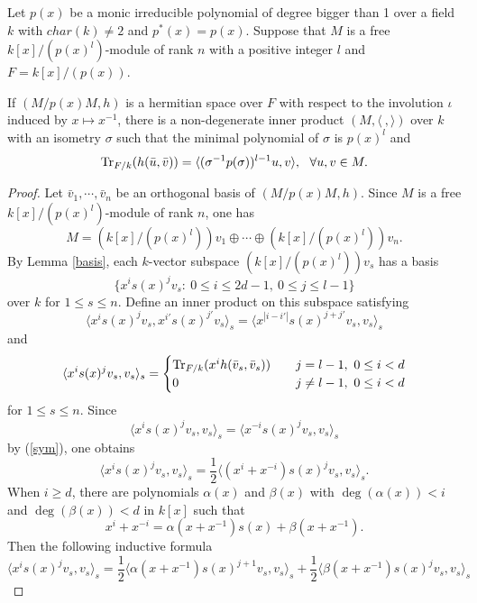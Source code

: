 \documentclass[12pt]{amsart}
\begin{document}
\begin{prop} \label{realization} Let $p(x)$ be a monic irreducible polynomial of degree bigger than 1 over a field $k$ with $char(k)\neq 2$ and $p^*(x)=p(x)$.  Suppose that $M$ is a free $k[x]/(p(x)^l)$-module of rank $n$ with a positive integer $l$ and $F=k[x]/(p(x))$. 

If $(M/p(x)M, h)$ is a hermitian space over $F$ with respect to the involution $\iota$ induced by $x\mapsto x^{-1}$,   there is a non-degenerate inner product $(M, \langle \ , \rangle)$ over $k$ with an isometry $\sigma$ such that the minimal polynomial of $\sigma$ is $p(x)^l$ and 
$$ {\rm Tr}_{F/k}(h(\bar u, \bar v))= \langle (\sigma^{-1} p(\sigma))^{l-1} u, v \rangle , \ \ \forall u, v \in M .$$
\end{prop}
\begin{proof} Let $\bar v_1, \cdots, \bar v_n$ be an orthogonal basis of $(M/p(x)M, h)$. Since $M$ is a free $k[x]/(p(x)^l)$-module of rank $n$, one has 
$$ M = (k[x]/(p(x)^l) )v_1 \oplus \cdots \oplus (k[x]/(p(x)^l)) v_n .$$
By Lemma \ref{basis}, each $k$-vector subspace $(k[x]/(p(x)^l) )v_s$ has a basis $$\{ x^i s(x)^j v_s: \ 0\leq i \leq 2d-1, \ 0\leq j \leq l-1 \} $$ over $k$ for $1\leq s\leq n$. Define an inner product on this subspace satisfying 
\begin{equation} \label{sym}  \langle x^{i}s(x)^j v_s, x^{i'}s(x)^{j'} v_s \rangle_s = \langle x^{|i-i'|} s(x)^{j+j'} v_s, v_s \rangle_s \end{equation}
and 
 \begin{equation} \label{value} \langle x^i s(x)^j v_s, v_s \rangle_s= \begin{cases}  {\rm Tr}_{F/k} (x^{i} h(\bar v_s, \bar v_s) ) \ \ \ & j=l-1, \ 0\leq i< d \\  
0 \ \ \ & j \neq l-1, \ 0\leq i<d \end{cases} \end{equation} 
 for $1\leq s\leq n$.  Since 
 $$ \langle x^i s(x)^j v_s, v_s \rangle_s =  \langle x^{-i} s(x)^j v_s, v_s \rangle_s $$ by (\ref{sym}), 
 one obtains 
 $$ \langle x^i s(x)^j v_s, v_s \rangle_s = \frac{1}{2}  \langle (x^i+x^{-i} )s(x)^j v_s, v_s \rangle_s . $$
 When $i\geq d$,  there are polynomials $\alpha(x)$ and $\beta(x)$ with $\deg (\alpha(x) )< i$ and $\deg(\beta(x)) < d$ in $k[x]$ such that 
 $$ x^i+x^{-i} = \alpha(x+x^{-1}) s(x) + \beta(x+x^{-1}) .$$ Then the following inductive formula
 $$ \langle x^i s(x)^j v_s, v_s \rangle_s = \frac{1}{2} \langle \alpha(x+x^{-1}) s(x)^{j+1} v_s, v_s \rangle_s +\frac{1}{2} \langle \beta(x+x^{-1}) s(x)^j v_s, v_s\rangle_s $$

\end{proof}
\end{document}
